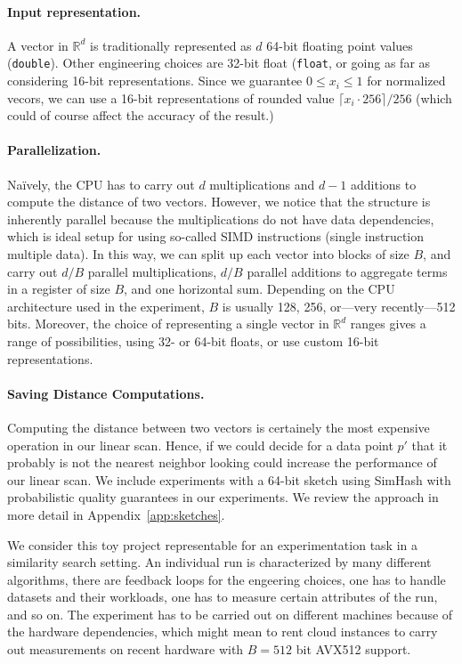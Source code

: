 \documentclass{llncs}
\begin{document}
\paragraph{Input representation.}
A vector in $\mathbb{R}^d$ is traditionally represented as $d$ 64-bit floating point values (\texttt{double}). Other engineering choices are 32-bit float (\texttt{float}, or going as far as considering 16-bit representations. Since we guarantee $0 \leq x_i \leq 1$ for normalized vecors, we can use a 16-bit representations of rounded value $\lceil x_i \cdot 256 \rceil / 256$ (which could of course affect the accuracy of the result.)

\paragraph{Parallelization.}
Naïvely, the CPU has to carry out $d$ multiplications and $d-1$ additions to compute the distance of two vectors.
However, we notice that the structure is inherently parallel because the multiplications do not have data dependencies, which is ideal setup for using so-called SIMD instructions (single instruction multiple data). 
In this way, we can split up each vector into blocks of size $B$, and carry out $d/B$ parallel multiplications, $d/B$ parallel additions to aggregate terms in a register of size $B$, and one horizontal sum. 
Depending on the CPU architecture used in the experiment, $B$ is usually 128, 256, or---very recently---512 bits. Moreover, the choice of representing a single vector in $\mathbb{R}^d$ ranges gives a range of possibilities, using 32- or 64-bit floats, or use custom 16-bit representations.

\paragraph{Saving Distance Computations.} Computing the distance 
between two vectors is certainely the most expensive operation in our linear scan. Hence, if we could decide for a data point $p'$ that it probably is not the nearest neighbor looking could increase the performance of our linear scan. We include experiments with a 64-bit sketch using SimHash with probabilistic quality guarantees in our experiments. We review the approach in more detail in Appendix~\ref{app:sketches}.

\medskip

We consider this toy project representable for an experimentation task in a similarity search setting. An individual run is characterized by many different algorithms, there are feedback loops for the engeering choices, one has to handle datasets and their workloads, one has to measure certain attributes of the run, and so on. The experiment has to be carried out on different machines because of the hardware dependencies, which might mean to rent cloud instances to carry out measurements on recent hardware with $B = 512$ bit AVX512 support.
\end{document}
